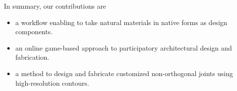 In summary, our contributions are
\begin{itemize}
 \item{a workflow enabling to take natural materials in native forms as design components.}
 \item{an online game-based approach to participatory architectural design and fabrication.}
 \item{a method to design and fabricate customized non-orthogonal joints using high-resolution contours.}
\end{itemize}
